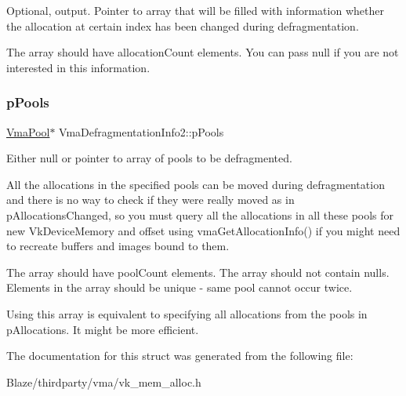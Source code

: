 Optional, output. Pointer to array that will be filled with information whether the allocation at certain index has been changed during defragmentation. 

The array should have {\ttfamily allocation\+Count} elements. You can pass null if you are not interested in this information. \mbox{\label{structVmaDefragmentationInfo2_a0b3effd57f3fcdeb2ed62210b4ef20e1}} 
\subsubsection{\texorpdfstring{p\+Pools}{pPools}}
{\footnotesize\ttfamily \hyperlink{structVmaPool}{Vma\+Pool}$\ast$ Vma\+Defragmentation\+Info2\+::p\+Pools}



Either null or pointer to array of pools to be defragmented. 

All the allocations in the specified pools can be moved during defragmentation and there is no way to check if they were really moved as in {\ttfamily p\+Allocations\+Changed}, so you must query all the allocations in all these pools for new {\ttfamily Vk\+Device\+Memory} and offset using vma\+Get\+Allocation\+Info() if you might need to recreate buffers and images bound to them.

The array should have {\ttfamily pool\+Count} elements. The array should not contain nulls. Elements in the array should be unique -\/ same pool cannot occur twice.

Using this array is equivalent to specifying all allocations from the pools in {\ttfamily p\+Allocations}. It might be more efficient. 

The documentation for this struct was generated from the following file\+:\begin{DoxyCompactItemize}
\item 
Blaze/thirdparty/vma/vk\+\_\+mem\+\_\+alloc.\+h\end{DoxyCompactItemize}
